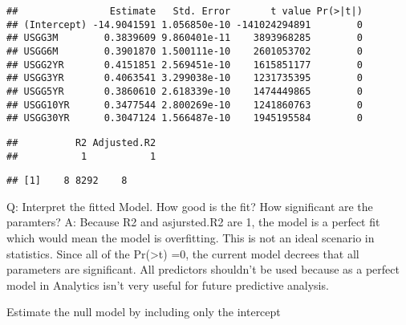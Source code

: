 \documentclass[]{article}
\newenvironment{Shaded}{\begin{snugshade}}{\end{snugshade}}
\newcommand{\KeywordTok}[1]{\textcolor[rgb]{0.13,0.29,0.53}{\textbf{#1}}}
\newcommand{\DataTypeTok}[1]{\textcolor[rgb]{0.13,0.29,0.53}{#1}}
\newcommand{\OperatorTok}[1]{\textcolor[rgb]{0.81,0.36,0.00}{\textbf{#1}}}
\newcommand{\NormalTok}[1]{#1}
\begin{document}
\begin{verbatim}
##                Estimate   Std. Error       t value Pr(>|t|)
## (Intercept) -14.9041591 1.056850e-10 -141024294891        0
## USGG3M        0.3839609 9.860401e-11    3893968285        0
## USGG6M        0.3901870 1.500111e-10    2601053702        0
## USGG2YR       0.4151851 2.569451e-10    1615851177        0
## USGG3YR       0.4063541 3.299038e-10    1231735395        0
## USGG5YR       0.3860610 2.618339e-10    1474449865        0
## USGG10YR      0.3477544 2.800269e-10    1241860763        0
## USGG30YR      0.3047124 1.566487e-10    1945195584        0
\end{verbatim}

\begin{Shaded}
\end{Shaded}

\begin{verbatim}
##          R2 Adjusted.R2 
##           1           1
\end{verbatim}

\begin{Shaded}
\end{Shaded}

\begin{verbatim}
## [1]    8 8292    8
\end{verbatim}

Q: Interpret the fitted Model. How good is the fit? How significant are
the paramters? A: Because R2 and asjursted.R2 are 1, the model is a
perfect fit which would mean the model is overfitting. This is not an
ideal scenario in statistics. Since all of the
Pr(\textgreater{}\textbar{}t\textbar{}) =0, the current model decrees
that all parameters are significant. All predictors shouldn't be used
because as a perfect model in Analytics isn't very useful for future
predictive analysis.

Estimate the null model by including only the intercept
\end{document}
